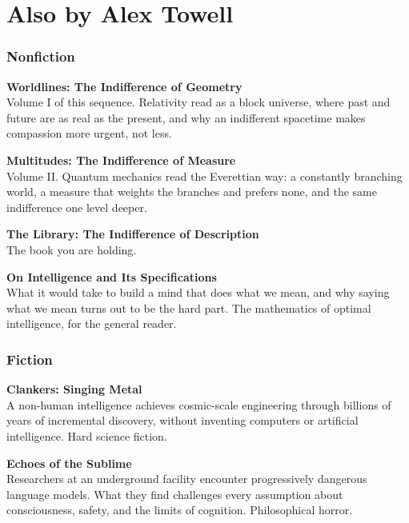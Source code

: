 \chapter*{Also by Alex Towell}

\subsection*{Nonfiction}

\textbf{Worldlines: The Indifference of Geometry}\\
Volume I of this sequence. Relativity read as a block universe, where past and future are as real as the present, and why an indifferent spacetime makes compassion more urgent, not less.

\bigskip

\textbf{Multitudes: The Indifference of Measure}\\
Volume II. Quantum mechanics read the Everettian way: a constantly branching world, a measure that weights the branches and prefers none, and the same indifference one level deeper.

\bigskip

\textbf{The Library: The Indifference of Description}\\
The book you are holding.

\bigskip

\textbf{On Intelligence and Its Specifications}\\
What it would take to build a mind that does what we mean, and why saying what we mean turns out to be the hard part. The mathematics of optimal intelligence, for the general reader.

\subsection*{Fiction}

\textbf{Clankers: Singing Metal}\\
A non-human intelligence achieves cosmic-scale engineering through billions of years of incremental discovery, without inventing computers or artificial intelligence. Hard science fiction.

\bigskip

\textbf{Echoes of the Sublime}\\
Researchers at an underground facility encounter progressively dangerous language models. What they find challenges every assumption about consciousness, safety, and the limits of cognition. Philosophical horror.

